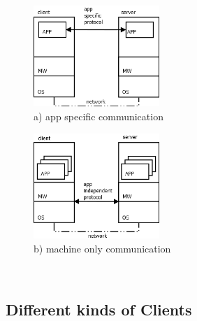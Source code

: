 \begin{minipage}{\linewidth}
      \centering
      \begin{minipage}{0.47\linewidth}
          \begin{figure}[H]
	           \includegraphics[width=180px]{gfx/clienta.png}
               \caption{a) app specific communication}
          \end{figure}
      \end{minipage}
      \hspace{0.05\linewidth}
      \begin{minipage}{0.47\linewidth}
          \begin{figure}[H]
        	\includegraphics[width=180px]{gfx/clientb.png}
            \caption{b) machine only communication}
            	\label{img:application_independent_proto}
          \end{figure}
      \end{minipage}
\end{minipage}
\ \\

\subsection{Different kinds of Clients}

